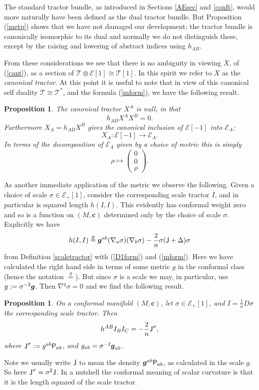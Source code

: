 \documentclass[a4paper,12pt]{amsart}
\def\Cal{\mathcal}
\newcommand{\V}{\mbox{\sf P}}
\newcommand{\J}{\mbox{\sf J}}
\newcommand{\cc}{\boldsymbol{c}}
\newcommand{\ce}{{\Cal E}}
\newcommand{\cT}{{\mathcal T}}
\def\bg{\mbox{\boldmath $g$}}
\newcommand{\si}{\sigma}
\newtheorem{proposition}[theorem]{Proposition}
\theoremstyle{remark}
\newcommand{\nn}[1]{(\ref{#1})}
\begin{document}
The standard
tractor bundle, as introduced in Sections \ref{AEsec} and \ref{conft},
would more naturally have been defined as the dual tractor bundle. But
Proposition \nn{metp} shows that we have not damaged our development;
the tractor bundle is canonically isomorphic to its dual and normally
we do not distinguish these, except by the raising and lowering of
abstract indices using $h_{AB}$.

From these considerations we see that there is no ambiguity in viewing
$X$, of \nn{cant}, as a section of $\cT\otimes \ce[1]\cong \cT[1]$. In
this spirit we refer to $X$ as the {\em canonical tractor}.  At this
point it is useful to note that in view of this canonical self duality
$\cT\cong\cT^*$, and the formula \nn{mform}, we have the following result.
 \begin{proposition}\label{Xnull}
The canonical tractor $X^A$ is null, in that 
$$
h_{AB}X^AX^B =0.
$$ 
Furthermore $X_A =h_{AB}X^B$ gives the canonical inclusion of
$\ce[-1]$ into $\ce_A$:
$$
X_A: \ce[-1]\to \ce_A. 
$$
In terms of the decomposition of $\ce_A$ given by a choice of metric this is simply
$$
\rho \mapsto \left(
\begin{array}{c}
0 \\ 
0 \\
\rho
\end{array}
\right).
$$
\end{proposition}

As another immediate application of the metric we observe the
following.  Given a choice of scale $\si\in \ce_+[1]$, consider the
corresponding scale tractor $I$, and in particular is squared length
$h(I,I)$. This evidently has conformal weight zero and so is a
function on $(M,\cc)$ determined only by the choice of scale
$\si$. Explicitly we have
\begin{equation}\label{I2}
h(I,I) \stackrel{g}{=} \bg^{ab}(\nabla_a \si)(\nabla_b \si) -
\frac{2}{n} \si (\J+\Delta )\si
\end{equation}
from Definition \ref{scaletractor} with \nn{D1form} and
\nn{mform}. Here we have calculated the right hand side in terms of some metric $g$ in the conformal class (hence the notation $\stackrel{g}{=}$). But since $\si$ is a scale we may, in particular, use $g:=\si^{-2}\bg$. Then $\nabla^g \si=0$ and we find the following result.
\begin{proposition}\label{scalarcurv}
On a conformal manifold $(M,\cc)$, let $\sigma\in \ce_+[1]$, and $I=
\frac{1}{n}D\si $ the corresponding scale tractor.  Then
$$
h^{AB} I_B I_C = - \frac{2}{n} \J^\si ,
$$
where $\J^\si:=g^{ab} \V_{ab}$, and $g_{ab}=\si^{-2}\bg_{ab}$.
\end{proposition}
\noindent Note we usually write $\J$ to mean the density
$\bg^{ab}\V_{ab}$, as calculated in the scale $g$. So here
$\J^\si=\si^2 \J$. In a nutshell the conformal meaning of scalar
curvature is that it is the length squared of the scale tractor.
\end{document}
